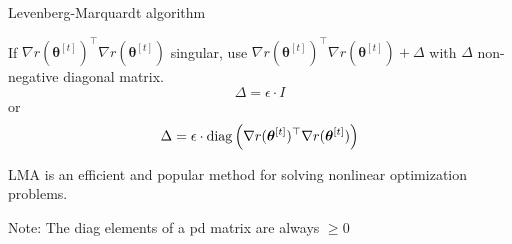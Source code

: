 \documentclass[11pt,compress,t,notes=noshow, xcolor=table]{beamer}
\begin{document}
%
%
%
%
\begin{vbframe}{Levenberg-Marquardt algorithm}

If $\nabla r(\bm{\theta}^{[t]})^\top\nabla r(\bm{\theta}^{[t]})$ singular, use $\nabla r(\bm{\theta}^{[t]})^\top\nabla r(\bm{\theta}^{[t]})+\Delta$ with $\Delta$ non-negative diagonal matrix.
\lz
$$
\Delta = \epsilon \cdot I
$$
or
$$
\Delta = \epsilon \cdot \operatorname{diag}\left(\nabla r(\bm{\theta}^{[t]})^\top\nabla r(\bm{\theta}^{[t]})\right)
$$

LMA is an efficient and popular method for solving nonlinear optimization problems.

\lz

Note: The diag elements of a pd matrix are always $\geq 0$

\end{vbframe}

\endlecture
\end{document}
